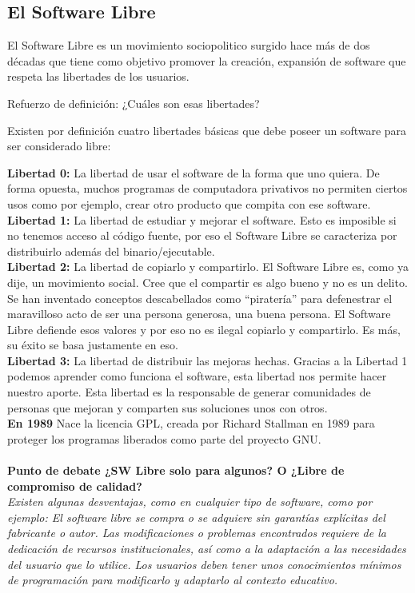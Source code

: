 \documentclass{book}
\begin{document}
\subsection{ El Software Libre}

El Software Libre es un movimiento sociopolitico surgido hace más de dos décadas que tiene como objetivo promover la creación, expansión de software que respeta las libertades de los usuarios.

Refuerzo de definición: ¿Cuáles son esas libertades?

Existen por definición cuatro libertades básicas que debe poseer un software para ser considerado libre:

{\bf Libertad 0:}
La libertad de usar el software de la forma que uno quiera. De forma opuesta, muchos programas de computadora privativos no permiten ciertos usos como por ejemplo, crear otro producto que compita con ese software.
\\
{\bf Libertad 1:}
La libertad de estudiar y mejorar el software. Esto es imposible si no tenemos acceso al código fuente, por eso el Software Libre se caracteriza por distribuirlo además del binario/ejecutable.
\\
{\bf Libertad 2:}
La libertad de copiarlo y compartirlo. El Software Libre es, como ya dije, un movimiento social. Cree que el compartir es algo bueno y no es un delito. Se han inventado conceptos descabellados como “piratería” para defenestrar el maravilloso acto de ser una persona generosa, una buena persona. El Software Libre defiende esos valores y por eso no es ilegal copiarlo y compartirlo. Es más, su éxito se basa justamente en eso.
\\
{\bf Libertad 3:}
La libertad de distribuir las mejoras hechas. Gracias a la Libertad 1 podemos aprender como funciona el software, esta libertad nos permite hacer nuestro aporte. Esta libertad es la responsable de generar comunidades de personas que mejoran y comparten sus soluciones unos con otros.
\\
{\bf En 1989} Nace la licencia GPL, creada por Richard Stallman en 1989 para proteger los programas liberados como parte del proyecto GNU.
\\
\\
{\bf Punto de debate ¿SW Libre solo para algunos? O ¿Libre de compromiso de calidad?}
{\it 
\\
Existen algunas desventajas, como en cualquier tipo de software, como por ejemplo:
El software libre se compra o se adquiere sin garantías explícitas del fabricante o autor.
Las modificaciones o problemas encontrados requiere de la dedicación de recursos institucionales, así como a la adaptación a las necesidades del usuario que lo utilice.
Los usuarios deben tener unos conocimientos mínimos de programación para modificarlo y adaptarlo al contexto educativo.
}
\end{document}
